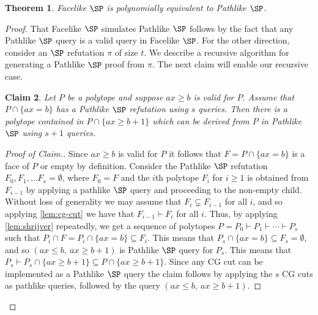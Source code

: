 \documentclass[11pt]{article}
\newtheorem{theorem}{Theorem}[section]
\newtheorem{claim}[theorem]{Claim}
\begin{document}
	\begin{theorem}
	\label{lem:SPtopSP}
		Facelike $\SP$ is polynomially equivalent to Pathlike $\SP$.	
	\end{theorem}
	\begin{proof}
		That Facelike $\SP$ simulates Pathlike $\SP$ follows by the fact that any Pathlike $\SP$ query is a valid query in Facelike $\SP$.  
		For the other direction, consider an $\SP$ refutation $\pi$ of size $t$. 
		We describe a recursive algorithm for generating a Pathlike $\SP$ proof from $\pi$.
		The next claim will enable our recursive case.
	
	\begin{claim}Let $P$ be a polytope and suppose $ax \geq b$ is valid for $P$. 
	Assume that $P \cap \{ax = b\}$ has a Pathlike $\SP$ refutation using $s$ queries. 
	Then there is a polytope contained in $P \cap \{ax \geq b+1\}$ which can be derived from $P$ in Pathlike $\SP$ using $s+1$ queries. \end{claim}
	\begin{proof}[Proof of Claim.]
		Since $ax \geq b$ is valid for $P$ it follows that $F = P \cap \{ax = b\}$ is a face of $P$ or empty by definition.
		Consider the Pathlike $\SP$ refutation  $F_0, F_1, \ldots F_s = \emptyset$, where $F_0=F$ and the $i$th polytope $F_i$ for $i \geq 1$ is obtained from $F_{i-1}$ by applying a pathlike $\SP$ query and proceeding to the non-empty child.
		Without loss of generality we may assume that $F_i \subsetneq F_{i-1}$ for all $i$, and so applying \autoref{lem:cg-cut} we have that $F_{i-1} \vdash F_i$ for all $i$.
		Thus, by applying \autoref{lem:shrijver} repeatedly, we get a sequence of polytopes $P = P_0 \vdash P_1 \vdash \cdots \vdash P_s$ such that $P_i \cap F = P_i \cap \{ax = b\} \subseteq F_i$. 
		This means that $P_s \cap \{ax = b\} \subseteq F_s = \emptyset$, and so $(ax \leq b,~ ax \geq b+1)$ is Pathlike $\SP$ query for $P_s$. 
		This means that $P_s \vdash P_s \cap \{ax \geq b+1\} \subseteq P \cap \{ax \geq b+1\}$.
		Since any CG cut can be implemented as a Pathlike $\SP$ query the claim follows by applying the $s$ CG cuts as pathlike queries, followed by the query $(ax \leq b,~ ax \geq b+1)$.
	\end{proof}
	

\end{proof}
\end{document}
